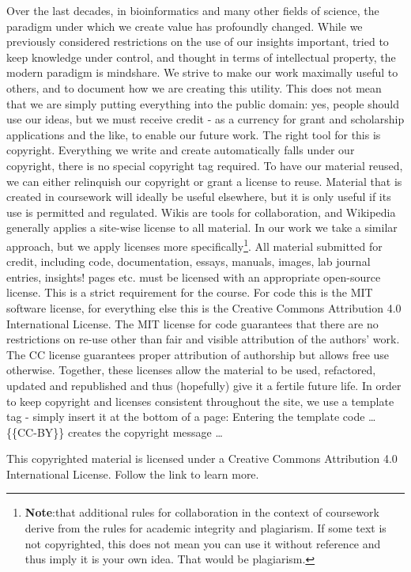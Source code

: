 \documentclass[]{book}
\let\rmarkdownfootnote\footnote%
\def\footnote{\protect\rmarkdownfootnote}
\begin{document}
Over the last decades, in bioinformatics and many other fields of
science, the paradigm under which we create value has profoundly
changed. While we previously considered restrictions on the use of our
insights important, tried to keep knowledge under control, and thought
in terms of intellectual property, the modern paradigm is mindshare. We
strive to make our work maximally useful to others, and to document how
we are creating this utility. This does not mean that we are simply
putting everything into the public domain: yes, people should use our
ideas, but we must receive credit - as a currency for grant and
scholarship applications and the like, to enable our future work. The
right tool for this is copyright. Everything we write and create
automatically falls under our copyright, there is no special copyright
tag required. To have our material reused, we can either relinquish our
copyright or grant a license to reuse. Material that is created in
coursework will ideally be useful elsewhere, but it is only useful if
its use is permitted and regulated. Wikis are tools for collaboration,
and Wikipedia generally applies a site-wise license to all material. In
our work we take a similar approach, but we apply licenses more
specifically\footnote{\textbf{Note}:that additional rules for
  collaboration in the context of coursework derive from the rules for
  academic integrity and plagiarism. If some text is not copyrighted,
  this does not mean you can use it without reference and thus imply it
  is your own idea. That would be plagiarism.}. All material submitted
for credit, including code, documentation, essays, manuals, images, lab
journal entries, insights! pages etc. must be licensed with an
appropriate open-source license. This is a strict requirement for the
course. For code this is the MIT software license, for everything else
this is the Creative Commons Attribution 4.0 International License. The
MIT license for code guarantees that there are no restrictions on re-use
other than fair and visible attribution of the authors' work. The CC
license guarantees proper attribution of authorship but allows free use
otherwise. Together, these licenses allow the material to be used,
refactored, updated and republished and thus (hopefully) give it a
fertile future life. In order to keep copyright and licenses consistent
throughout the site, we use a template tag - simply insert it at the
bottom of a page: Entering the template code \ldots{} \{\{CC-BY\}\}
creates the copyright message \ldots{}

This copyrighted material is licensed under a Creative Commons
Attribution 4.0 International License. Follow the link to learn more.
\end{document}
